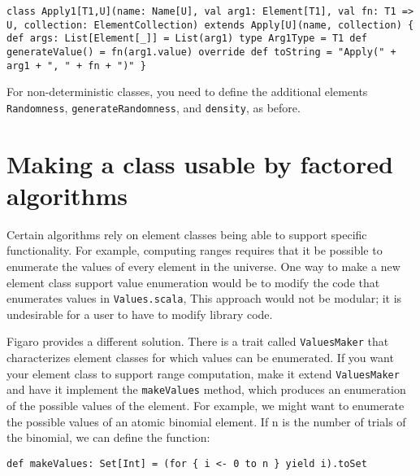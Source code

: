 \begin{flushleft}
\texttt{class Apply1[T1,U](name: Name[U], val arg1: Element[T1], val fn: T1
=> U, collection: ElementCollection)
\newline extends Apply[U](name, collection) \{
\newline \tab def args: List[Element[\_]] = List(arg1)
\newline 
\newline \tab type Arg1Type = T1
\newline 
\newline \tab def generateValue() = fn(arg1.value)
\newline 
\newline \tab override def toString = "Apply(" + arg1 + ", " + fn + ")"
\newline \}
}
\end{flushleft}

For non-deterministic classes, you need to define the additional elements \texttt{Randomness}, \texttt{generateRandomness}, and \texttt{density}, as before.

\section{Making a class usable by factored algorithms}

Certain algorithms rely on element classes being able to support specific functionality. For example, computing ranges requires that it be possible to enumerate the values of every element in the universe. One way to make a new element class support value enumeration would be to modify the code that enumerates values in \texttt{Values.scala}, This approach would not be modular; it is undesirable for a user to have to modify library code.

Figaro provides a different solution. There is a trait called \texttt{ValuesMa\-ker} that characterizes element classes for which values can be enumerated. If you want your element class to support range computation, make it extend \texttt{ValuesMaker} and have it implement the \texttt{makeValues} method, which produces an enumeration of the possible values of the element. For example, we might want to enumerate the possible values of an atomic binomial element. If n is the number of trials of the binomial, we can define the function:

\begin{flushleft}
\texttt{def makeValues: Set[Int] = (for \{ i <- 0 to n \} yield i).toSet}
\end{flushleft}

